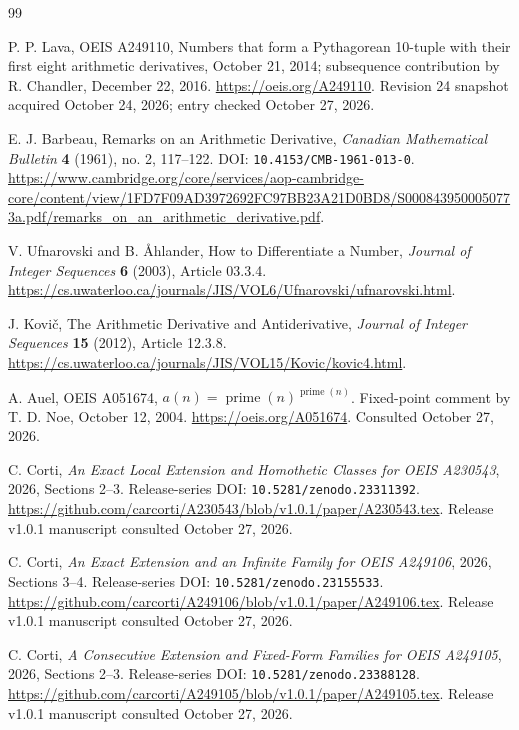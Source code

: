 \documentclass[11pt]{article}
\theoremstyle{definition}
\theoremstyle{remark}
\begin{document}
\clearpage
\begin{thebibliography}{99}
\sloppy\raggedright

P. P. Lava, OEIS A249110, Numbers that form a Pythagorean 10-tuple
with their first eight arithmetic derivatives, October 21, 2014;
subsequence contribution by R. Chandler, December 22, 2016.
\url{https://oeis.org/A249110}.
Revision 24 snapshot acquired October 24, 2026; entry checked
October 27, 2026.

E. J. Barbeau, Remarks on an Arithmetic Derivative,
\emph{Canadian Mathematical Bulletin} \textbf{4} (1961), no. 2, 117--122.
DOI: \texttt{10.4153/CMB-1961-013-0}.
\url{https://www.cambridge.org/core/services/aop-cambridge-core/content/view/1FD7F09AD3972692FC97BB23A21D0BD8/S0008439500050773a.pdf/remarks_on_an_arithmetic_derivative.pdf}.

V. Ufnarovski and B. \AA hlander, How to Differentiate a Number,
\emph{Journal of Integer Sequences} \textbf{6} (2003), Article 03.3.4.
\url{https://cs.uwaterloo.ca/journals/JIS/VOL6/Ufnarovski/ufnarovski.html}.

J. Kovi\v{c}, The Arithmetic Derivative and Antiderivative,
\emph{Journal of Integer Sequences} \textbf{15} (2012), Article 12.3.8.
\url{https://cs.uwaterloo.ca/journals/JIS/VOL15/Kovic/kovic4.html}.

A. Auel, OEIS A051674, $a(n)=\operatorname{prime}(n)^{\operatorname{prime}(n)}$.
Fixed-point comment by T. D. Noe, October 12, 2004.
\url{https://oeis.org/A051674}. Consulted October 27, 2026.

C. Corti, \emph{An Exact Local Extension and Homothetic Classes for
OEIS A230543}, 2026, Sections 2--3.
Release-series DOI: \texttt{10.5281/zenodo.23311392}.
\url{https://github.com/carcorti/A230543/blob/v1.0.1/paper/A230543.tex}.
Release v1.0.1 manuscript consulted October 27, 2026.

C. Corti, \emph{An Exact Extension and an Infinite Family for
OEIS A249106}, 2026, Sections 3--4.
Release-series DOI: \texttt{10.5281/zenodo.23155533}.
\url{https://github.com/carcorti/A249106/blob/v1.0.1/paper/A249106.tex}.
Release v1.0.1 manuscript consulted October 27, 2026.

C. Corti, \emph{A Consecutive Extension and Fixed-Form Families for
OEIS A249105}, 2026, Sections 2--3.
Release-series DOI: \texttt{10.5281/zenodo.23388128}.
\url{https://github.com/carcorti/A249105/blob/v1.0.1/paper/A249105.tex}.
Release v1.0.1 manuscript consulted October 27, 2026.


\end{thebibliography}
\end{document}
